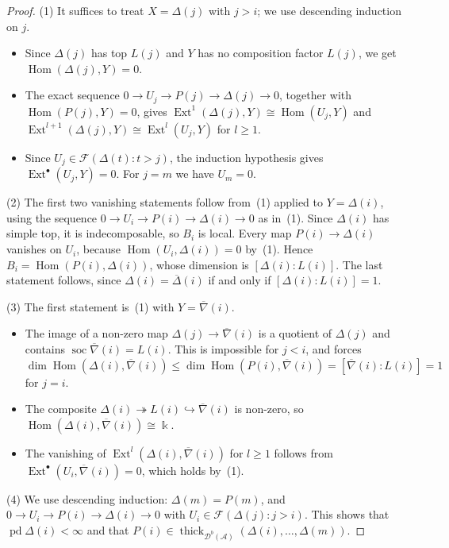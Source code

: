 \documentclass[11pt,reqno]{amsart}
\theoremstyle{plain}
\theoremstyle{definition}
\theoremstyle{remark}
\newcommand{\kk}{\Bbbk}
\DeclareMathOperator{\Hom}{Hom}
\DeclareMathOperator{\Ext}{Ext}
\DeclareMathOperator{\pd}{pd}
\DeclareMathOperator{\soc}{soc}
\newcommand{\Db}{\mathcal{D}^b}
\newcommand{\thick}[2][\cD]{\operatorname{thick}_{#1}(#2)}
\newcommand{\nablabar}{\overline{\nabla}}
\newcommand{\Deltabar}{\overline{\Delta}}
\newcommand{\cD}{\mathcal{D}}
\newcommand{\cA}{\mathcal{A}}
\newcommand{\cF}{\mathcal{F}}
\begin{document}
\begin{proof}
(1) It suffices to treat $X=\Delta(j)$ with $j>i$; we use descending induction on $j$.
\begin{itemize}
\item Since $\Delta(j)$ has top $L(j)$ and $Y$ has no composition factor $L(j)$, we get $\Hom(\Delta(j),Y)=0$.
\item The exact sequence $0\to U_j\to P(j)\to\Delta(j)\to0$, together with $\Hom(P(j),Y)=0$, gives $\Ext^1(\Delta(j),Y)\cong\Hom(U_j,Y)$ and $\Ext^{l+1}(\Delta(j),Y)\cong\Ext^l(U_j,Y)$ for $l\ge1$.
\item Since $U_j\in\cF(\Delta(t):t>j)$, the induction hypothesis gives $\Ext^\bullet(U_j,Y)=0$. For $j=m$ we have $U_m=0$.
\end{itemize}

(2) The first two vanishing statements follow from~(1) applied to $Y=\Delta(i)$, using the sequence $0\to U_i\to P(i)\to\Delta(i)\to0$ as in~(1). Since $\Delta(i)$ has simple top, it is indecomposable, so $B_i$ is local. Every map $P(i)\to\Delta(i)$ vanishes on $U_i$, because $\Hom(U_i,\Delta(i))=0$ by~(1). Hence $B_i=\Hom(P(i),\Delta(i))$, whose dimension is $[\Delta(i):L(i)]$. The last statement follows, since $\Delta(i)=\Deltabar(i)$ if and only if $[\Delta(i):L(i)]=1$.

(3) The first statement is~(1) with $Y=\nablabar(i)$.
\begin{itemize}
\item The image of a non-zero map $\Delta(j)\to\nablabar(i)$ is a quotient of $\Delta(j)$ and contains $\soc\nablabar(i)=L(i)$. This is impossible for $j<i$, and forces $\dim\Hom(\Delta(i),\nablabar(i))\le\dim\Hom(P(i),\nablabar(i))=[\nablabar(i):L(i)]=1$ for $j=i$.
\item The composite $\Delta(i)\twoheadrightarrow L(i)\hookrightarrow\nablabar(i)$ is non-zero, so $\Hom(\Delta(i),\nablabar(i))\cong\kk$.
\item The vanishing of $\Ext^{l}(\Delta(i),\nablabar(i))$ for $l\ge1$ follows from $\Ext^\bullet(U_i,\nablabar(i))=0$, which holds by~(1).
\end{itemize}

(4) We use descending induction: $\Delta(m)=P(m)$, and $0\to U_i\to P(i)\to\Delta(i)\to0$ with $U_i\in\cF(\Delta(j):j>i)$. This shows that $\pd\Delta(i)<\infty$ and that $P(i)\in\thick[\Db(\cA)]{\Delta(i),\dots,\Delta(m)}$.
\end{proof}
\end{document}
